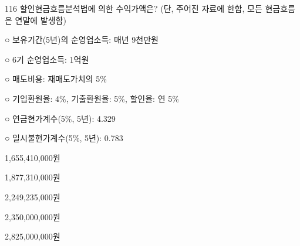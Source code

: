 \begin{question}{116}
할인현금흐름분석법에 의한 수익가액은? (단, 주어진 자료에 한함, 모든 현금흐름은 연말에 발생함)
\begin{framedtext}
○ 보유기간(5년)의 순영업소득: 매년 9천만원 \par
○ 6기 순영업소득: 1억원 \par
○ 매도비용: 재매도가치의 5\% \par
○ 기입환원율: 4\%, 기출환원율: 5\%, 할인율: 연 5\% \par
○ 연금현가계수(5\%, 5년): 4.329 \par
○ 일시불현가계수(5\%, 5년): 0.783
\end{framedtext}
\begin{choices}
  \item 1,655,410,000원
  \item 1,877,310,000원
  \item 2,249,235,000원
  \item 2,350,000,000원
  \item 2,825,000,000원
\end{choices}
\end{question}
